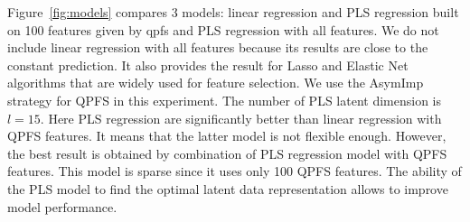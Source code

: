 \documentclass[12pt,twoside]{article}
\theoremstyle{definition}
\begin{document}
Figure~\ref{fig:models} compares 3 models: linear regression and PLS regression built on 100 features given by qpfs and PLS regression with all features.
We do not include linear regression with all features because its results are close to the constant prediction. It also provides the result for Lasso and Elastic Net algorithms that are widely used for feature selection.
We use the AsymImp strategy for QPFS in this experiment.
The number of PLS latent dimension is $l = 15$.
Here PLS regression are significantly better than linear regression with QPFS features.
It means that the latter model is not flexible enough.
However, the best result is obtained by combination of PLS regression model with QPFS features. 
This model is sparse since it uses only 100 QPFS features.
The ability of the PLS model to find the optimal latent data representation allows to improve model performance. 
\end{document}
